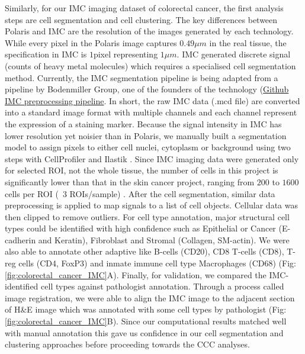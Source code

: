 Similarly, for our IMC imaging dataset of colorectal cancer, the first analysis steps are cell segmentation and cell clustering. The key differences between Polaris and IMC are the resolution of the images generated by each technology. While every pixel in the Polaris image captures $0.49 \mu m$ in the real tissue, the specification in IMC is $1$pixel representing $1\mu m$. IMC generated discrete signal (counts of heavy metal molecules) which requires a specialised cell segmentation method. Currently, the IMC segmentation pipeline is being adapted from a pipeline by Bodenmiller Group, one of the founders of the technology (\href{https://github.com/BodenmillerGroup/ImcSegmentationPipeline/blob/development/scripts/imc_preprocessing.ipynb}{Github IMC preprocessing pipeline}. In short, the raw IMC data (.mcd file) are converted into a standard image format with multiple channels and each channel represent the expression of a staining marker. Because the signal intensity in IMC has lower resolution yet noisier than in Polaris, we manually built a segmentation model to assign pixels to either cell nuclei, cytoplasm or background using two steps with CellProfiler and Ilastik \cite{carpenter2006cellprofiler, berg2019ilastik}. Since IMC imaging data were generated only for selected ROI, not the whole tissue, the number of cells in this project is significantly lower than that in the skin cancer project, ranging from $200$ to $1600$ cells per ROI (~3 ROIs/sample) . After the cell segmentation, similar data preprocessing is applied to map signals to a list of cell objects. Cellular data was then clipped to remove outliers. For cell type annotation, major structural cell types could be identified with high confidence such as Epithelial or Cancer (E-cadherin and Keratin), Fibroblast and Stromal (Collagen, SM-actin). We were also able to annotate other adaptive like B-cells (CD20), CD8 T-cells (CD8), T-reg cells (CD4, FoxP3) and inmate immune cell type Macrophages (CD68) (Fig:\ref{fig:colorectal_cancer_IMC}A). Finally, for validation, we compared the IMC-identified cell types against pathologist annotation. Through a process called image registration, we were able to align the IMC image to the adjacent section of H\&E image which was annotated with some cell types by pathologist (Fig:\ref{fig:colorectal_cancer_IMC}B). Since our computational results matched well with manual annotation this gave us confidence in our cell segmentation and clustering approaches before proceeding towards the CCC analyses. 


